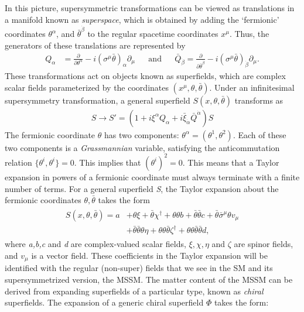 In this picture, supersymmetric transformations can be viewed as translations in a manifold known as \emph{superspace}, which is obtained by adding the `fermionic' coordinates $\theta^\alpha$, and $\bar{\theta}^{\dot{\beta}}$ to the regular spacetime coordinates $x^\mu$. Thus, the generators of these translations are represented by
\begin{align}
  Q_\alpha &= \frac{\partial}{\partial\theta^\alpha}-i(\sigma^\mu \bar{\theta})_\alpha \partial_\mu&&\text{and}&&
  \bar{Q}_{\dot{\beta}} = \frac{\partial}{\partial\bar{\theta}^{\dot{\beta}}}-i(\sigma^\mu\bar{\theta})_{\dot{\beta}}\partial_\mu.
\label{eq:susy_operators_diff_form}
\end{align}
These transformations act on objects known as superfields, which are complex scalar fields parameterized by the coordinates $(x^\mu,\theta,\bar{\theta})$.
Under an infinitesimal supersymmetry transformation, a general superfield $S(x,\theta,\bar{\theta})$ transforms as
\begin{align}
S\rightarrow S' = (1+i\xi^\alpha Q_\alpha + i\bar{\xi}_{\dot{\alpha}}\bar{Q}^{\dot{\alpha}})S
\label{eq:gen_susy_transformation}
\end{align}
The fermionic coordinate $\theta$ has two components: $\theta^\alpha = (\theta^1,\theta^2)$. Each of these two components is a \emph{Grassmannian} variable, satisfying the anticommutation relation $\{\theta^i,\theta^i\} = 0$. This implies that $(\theta^i)^2 = 0$. This means that a Taylor expansion in powers of a fermionic coordinate must always terminate with a finite number of terms. For a general superfield \emph{S}, the Taylor expansion about the fermionic coordinates $\theta,\bar{\theta}$ takes the form
\begin{align}
  \begin{split}
  S(x,\theta,\bar{\theta}) = a &+ \theta\xi + \bar{\theta}\chi^\dagger + \theta\theta b + \bar{\theta}\bar{\theta}c+\bar{\theta}\bar{\sigma}^\mu\theta v_\mu \\
  &+ \bar{\theta}\bar{\theta}\theta\eta + \theta\theta\bar{\theta}\zeta^\dagger+\theta\theta\bar{\theta}\bar{\theta}d,
\end{split}
  \label{eq:general_superfield_expansion}
\end{align}
where \emph{a,b,c} and \emph{d} are complex-valued scalar fields, $\xi,\chi,\eta$ and $\zeta$ are spinor fields, and $v_\mu$ is a vector field. These coefficients in the Taylor expansion will be identified with the regular (non-super) fields that we see in the SM and its supersymmetrized version, the MSSM. The matter content of the MSSM can be derived from expanding superfields of a particular type, known as \emph{chiral} superfields. The expansion of a generic chiral superfield $\Phi$ takes the form:
